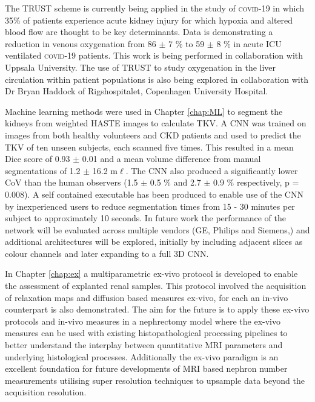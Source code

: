 The \ac{TRUST} scheme is currently being applied in the study of \textsc{covid}-19 in which 35\% of patients experience acute kidney injury for which hypoxia and altered blood flow are thought to be key determinants. Data is demonstrating a reduction in venous oxygenation from 86 $\pm$ 7 \% to 59 $\pm$ 8 \% in acute \ac{ICU} ventilated \textsc{covid}-19 patients. This work is being performed in collaboration with Uppsala University. The use of \ac{TRUST} to study oxygenation in the liver circulation within patient populations is also being explored in collaboration with Dr Bryan Haddock of Rigshospitalet, Copenhagen University Hospital.

Machine learning methods were used in Chapter \ref{chap:ML} to segment the kidneys from \ttwo weighted \ac{HASTE} images to calculate \ac{TKV}. A \ac{CNN} was trained on images from both healthy volunteers and \ac{CKD} patients and used to predict the \ac{TKV} of ten unseen subjects, each scanned five times. This resulted in a mean Dice score of 0.93 $\pm$ 0.01 and a mean volume difference from manual segmentations of 1.2 $\pm$ 16.2 m$\ell$. The \ac{CNN} also produced a significantly lower \ac{CoV} than the human observers (1.5 $\pm$ 0.5 \% and 2.7 $\pm$ 0.9 \% respectively, p = 0.008). A self contained executable has been produced to enable use of the \ac{CNN} by inexperienced users to reduce segmentation times from 15 - 30 minutes per subject to approximately 10 seconds. In future work the performance of the network will be evaluated across multiple vendors (GE, Philips and Siemens,) and additional architectures will be explored, initially by including adjacent slices as colour channels and later expanding to a full 3D \ac{CNN}. 

In Chapter \ref{chap:ex} a multiparametric ex-vivo protocol is developed to enable the assessment of explanted renal samples. This protocol involved the acquisition of relaxation maps and diffusion based measures ex-vivo, for each an in-vivo counterpart is also demonstrated. The aim for the future is to apply these ex-vivo protocols and in-vivo measures in a nephrectomy model where the ex-vivo measures can be used with existing histopathological processing pipelines to better understand the interplay between quantitative \ac{MRI} parameters and underlying histological processes. Additionally the ex-vivo paradigm is an excellent foundation for future developments of \ac{MRI} based nephron number measurements utilising super resolution techniques to upsample data beyond the acquisition resolution.

